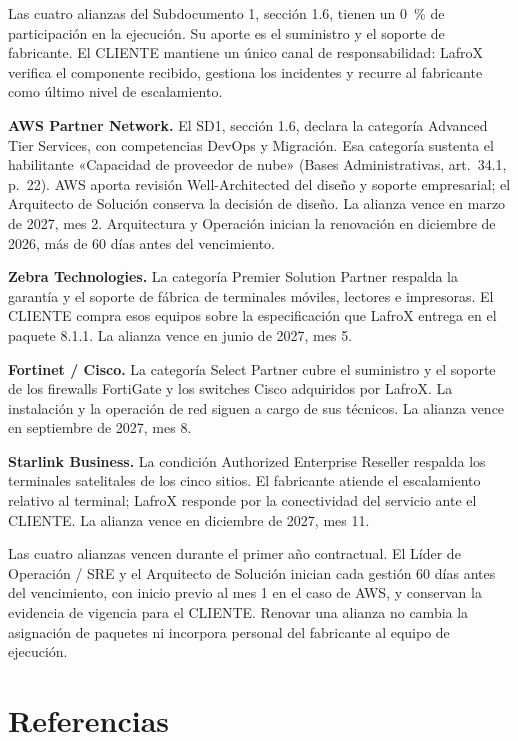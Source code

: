 Las cuatro alianzas del Subdocumento 1, sección 1.6, tienen un 0~\% de participación en la ejecución. Su aporte es el suministro y el soporte de fabricante. El CLIENTE mantiene un único canal de responsabilidad: LafroX verifica el componente recibido, gestiona los incidentes y recurre al fabricante como último nivel de escalamiento.

\textbf{AWS Partner Network.} El SD1, sección 1.6, declara la categoría Advanced Tier Services, con competencias DevOps y Migración. Esa categoría sustenta el habilitante «Capacidad de proveedor de nube» (Bases Administrativas, art.~34.1, p.~22). AWS aporta revisión Well-Architected del diseño y soporte empresarial; el Arquitecto de Solución conserva la decisión de diseño. La alianza vence en marzo de 2027, mes 2. Arquitectura y Operación inician la renovación en diciembre de 2026, más de 60 días antes del vencimiento.

\textbf{Zebra Technologies.} La categoría Premier Solution Partner respalda la garantía y el soporte de fábrica de terminales móviles, lectores e impresoras. El CLIENTE compra esos equipos sobre la especificación que LafroX entrega en el paquete 8.1.1. La alianza vence en junio de 2027, mes 5.

\textbf{Fortinet / Cisco.} La categoría Select Partner cubre el suministro y el soporte de los firewalls FortiGate y los switches Cisco adquiridos por LafroX. La instalación y la operación de red siguen a cargo de sus técnicos. La alianza vence en septiembre de 2027, mes 8.

\textbf{Starlink Business.} La condición Authorized Enterprise Reseller respalda los terminales satelitales de los cinco sitios. El fabricante atiende el escalamiento relativo al terminal; LafroX responde por la conectividad del servicio ante el CLIENTE. La alianza vence en diciembre de 2027, mes 11.

Las cuatro alianzas vencen durante el primer año contractual. El Líder de Operación / SRE y el Arquitecto de Solución inician cada gestión 60 días antes del vencimiento, con inicio previo al mes 1 en el caso de AWS, y conservan la evidencia de vigencia para el CLIENTE. Renovar una alianza no cambia la asignación de paquetes ni incorpora personal del fabricante al equipo de ejecución.

\section*{Referencias}
{}


